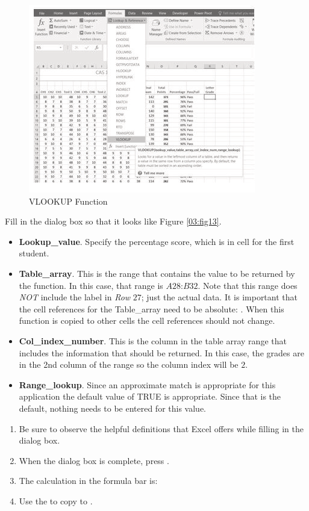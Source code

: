 \begin{figure}[H]
	\centering
	\includegraphics[width=\maxwidth{.95\linewidth}]{gfx/ch03_fig12}
	\caption{VLOOKUP Function}
	\label{03:fig12}
\end{figure}

Fill in the dialog box so that it looks like Figure \ref{03:fig13}.

\begin{itemize}
	\item \textbf{Lookup\_value}. Specify the percentage score, which is in cell  for the first student.
	\item \textbf{Table\_array}. This is the range that contains the value to be returned by the function. In this case, that range is $ A28 $:$ B32 $. Note that this range does \textit{NOT} include the label in \textit{Row} $ 27 $; just the actual data. It is important that the cell references for the Table\_array need to be absolute: . When this function is copied to other cells the cell references should not change.
	\item \textbf{Col\_index\_number}. This is the column in the table array range that includes the information that should be returned. In this case, the grades are in the 2nd column of the range so the column index will be $ 2 $.
	\item \textbf{Range\_lookup}. Since an approximate match is appropriate for this application the default value of TRUE is appropriate. Since that is the default, nothing needs to be entered for this value. 
\end{itemize}

\begin{enumerate}[resume]
	\item Be sure to observe the helpful definitions that Excel offers while filling in the  dialog box.
	\item When the dialog box is complete, press .
	\item The calculation in the formula bar is: 
	\item Use the  to copy  to .
\end{enumerate}

